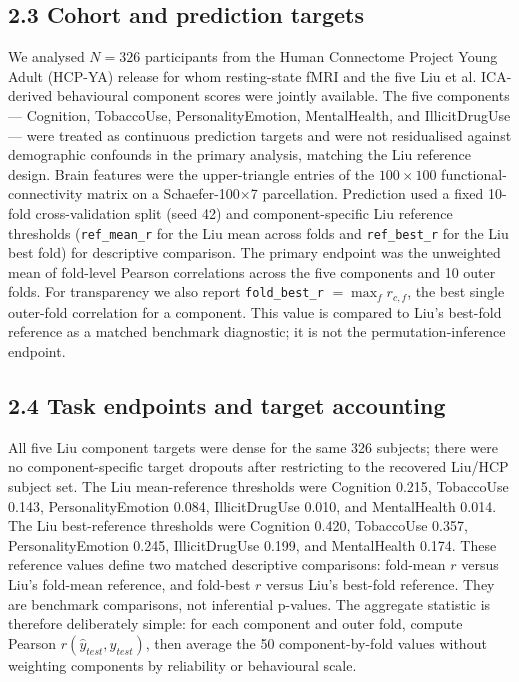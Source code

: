 \documentclass[11pt,letterpaper]{report}
\begin{document}
\subsection*{2.3 Cohort and prediction targets}

We analysed $N = 326$ participants from the Human Connectome Project Young Adult (HCP-YA) release for whom resting-state fMRI and the five Liu et al. ICA-derived behavioural component scores were jointly available. The five components --- Cognition, TobaccoUse, PersonalityEmotion, MentalHealth, and IllicitDrugUse --- were treated as continuous prediction targets and were not residualised against demographic confounds in the primary analysis, matching the Liu reference design. Brain features were the upper-triangle entries of the $100 \times 100$ functional-connectivity matrix on a Schaefer-100$\times$7 parcellation. Prediction used a fixed 10-fold cross-validation split (seed 42) and component-specific Liu reference thresholds (\texttt{ref\_mean\_r} for the Liu mean across folds and \texttt{ref\_best\_r} for the Liu best fold) for descriptive comparison. The primary endpoint was the unweighted mean of fold-level Pearson correlations across the five components and 10 outer folds. For transparency we also report \texttt{fold\_best\_r} $= \max_f r_{c,f}$, the best single outer-fold correlation for a component. This value is compared to Liu's best-fold reference as a matched benchmark diagnostic; it is not the permutation-inference endpoint.

\subsection*{2.4 Task endpoints and target accounting}

All five Liu component targets were dense for the same 326 subjects; there were no component-specific target dropouts after restricting to the recovered Liu/HCP subject set. The Liu mean-reference thresholds were Cognition 0.215, TobaccoUse 0.143, PersonalityEmotion 0.084, IllicitDrugUse 0.010, and MentalHealth 0.014. The Liu best-reference thresholds were Cognition 0.420, TobaccoUse 0.357, PersonalityEmotion 0.245, IllicitDrugUse 0.199, and MentalHealth 0.174. These reference values define two matched descriptive comparisons: fold-mean $r$ versus Liu's fold-mean reference, and fold-best $r$ versus Liu's best-fold reference. They are benchmark comparisons, not inferential p-values. The aggregate statistic is therefore deliberately simple: for each component and outer fold, compute Pearson $r(\hat{y}_{test}, y_{test})$, then average the 50 component-by-fold values without weighting components by reliability or behavioural scale.
\end{document}
